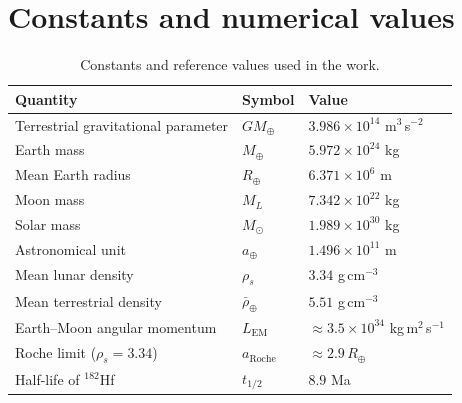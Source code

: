 \documentclass[11pt,a4paper,openany]{report}
\newcommand{\Mt}{M_{\oplus}}
\newcommand{\Rt}{R_{\oplus}}
\newcommand{\aR}{a_{\mathrm{Roche}}}
\begin{document}
\chapter{Constants and numerical values}
\label{app:constantes}

\begin{table}[htbp]
\centering
\small
\caption{Constants and reference values used in the work.}
\label{tab:constantes}
\begin{tabular}{lll}
\toprule
\textbf{Quantity} & \textbf{Symbol} & \textbf{Value} \\
\midrule
Terrestrial gravitational parameter & $G\Mt$ & $3.986\times10^{14}$ m$^3$\,s$^{-2}$ \\
Earth mass & $\Mt$ & $5.972\times10^{24}$ kg \\
Mean Earth radius & $\Rt$ & $6.371\times10^{6}$ m \\
Moon mass & $M_L$ & $7.342\times10^{22}$ kg \\
Solar mass & $M_\odot$ & $1.989\times10^{30}$ kg \\
Astronomical unit & $a_\oplus$ & $1.496\times10^{11}$ m \\
Mean lunar density & $\rho_s$ & $3.34$ g\,cm$^{-3}$ \\
Mean terrestrial density & $\bar\rho_\oplus$ & $5.51$ g\,cm$^{-3}$ \\
Earth--Moon angular momentum & $L_{\mathrm{EM}}$ & $\approx3.5\times10^{34}$ kg\,m$^2$\,s$^{-1}$ \\
Roche limit ($\rho_s=3.34$) & $\aR$ & $\approx2.9\,\Rt$ \\
Half-life of $^{182}$Hf & $t_{1/2}$ & $8.9$ Ma \\
\bottomrule
\end{tabular}
\end{table}
\end{document}
